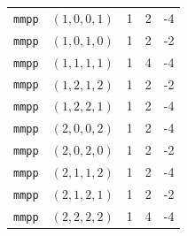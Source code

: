\begin{longtable}{lrrrr}
\texttt{mmpp} & $(1,0,0,1)$ & 1 & 2 & -4\\
\texttt{mmpp} & $(1,0,1,0)$ & 1 & 2 & -2\\
\texttt{mmpp} & $(1,1,1,1)$ & 1 & 4 & -4\\
\texttt{mmpp} & $(1,2,1,2)$ & 1 & 2 & -2\\
\texttt{mmpp} & $(1,2,2,1)$ & 1 & 2 & -4\\
\texttt{mmpp} & $(2,0,0,2)$ & 1 & 2 & -4\\
\texttt{mmpp} & $(2,0,2,0)$ & 1 & 2 & -2\\
\texttt{mmpp} & $(2,1,1,2)$ & 1 & 2 & -4\\
\texttt{mmpp} & $(2,1,2,1)$ & 1 & 2 & -2\\
\texttt{mmpp} & $(2,2,2,2)$ & 1 & 4 & -4\\
\end{longtable}
\endgroup
